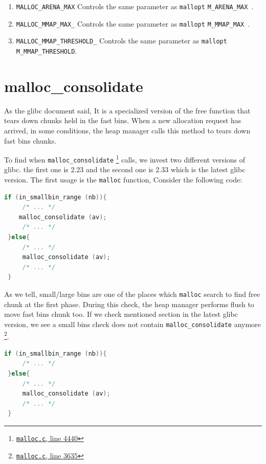 \documentclass{masterthesis}
\newcommand*\libc{glibc}
\newcommand*\fb{fast bins}
\newcommand*\lb{large bins}
\newcommand*\sbs{small bins}
\newcommand*\mallocc{\lstinline{malloc}\xspace}
\begin{document}
\begin{enumerate}
\item \lstinline{MALLOC_ARENA_MAX} Controls the same parameter as \lstinline{mallopt} \lstinline{M_ARENA_MAX }.

\item \lstinline{MALLOC_MMAP_MAX_} Controls the same parameter as  \lstinline{mallopt}  \lstinline{M_MMAP_MAX }.

\item \lstinline{MALLOC_MMAP_THRESHOLD_} Controls the same parameter as \lstinline{mallopt} \lstinline{M_MMAP_THRESHOLD}.
\end{enumerate}

\section{malloc\_consolidate}
As the \libc{} document said, It is a specialized version of the free function that tears down chunks held in the \fb{}. When a new allocation request has arrived, in some conditions, the heap manager calls this method to tears down \fb{} chunks.

To find when \lstinline{malloc_consolidate} \footnote{\href{https://sourceware.org/git/?p=glibc.git;a=blob;f=malloc/malloc.c;h=f7cd29bc2f93e1082ee77800bd64a4b2a2897055;hb=9ea3686266dca3f004ba874745a4087a89682617\#l4440}{\texttt{malloc.c}, line 4440}} calls, we invest two different versions of \libc{}. the first one is 2.23 and the second one is 2.33 which is the latest \libc{} version. The first usage is the \mallocc{} function, Consider the following code:

\begin{lstlisting}[language=c,frame=tlrb]
 if (in_smallbin_range (nb)){
	 /* ... */
 	malloc_consolidate (av);
	 /* ... */
 }else{
	 /* ... */
	 malloc_consolidate (av);
	 /* ... */
 }
\end{lstlisting}

As we tell, small/\lb{} are one of the places which \mallocc{} search to find free chunk at the first phase. During this check, the heap manager performs flush to move \fb{} chunk too. If we check mentioned section in the latest \libc{} version, we see a \sbs{} check does not contain \lstinline{malloc_consolidate} anymore \footnote{\href{https://sourceware.org/git/?p=glibc.git;a=blob;f=malloc/malloc.c;h=f7cd29bc2f93e1082ee77800bd64a4b2a2897055;hb=9ea3686266dca3f004ba874745a4087a89682617\#l3635}{\texttt{malloc.c}, line 3635}}.

\begin{lstlisting}[language=c,frame=tlrb]
 if (in_smallbin_range (nb)){
 	 /* ... */
 }else{
	 /* ... */
	 malloc_consolidate (av);
	 /* ... */
 }
\end{lstlisting}
\end{document}
